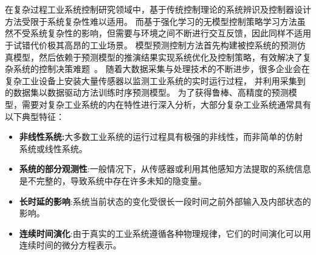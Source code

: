 \renewcommand{\b}{\boldsymbol}

\chapter{\TitlechapterI}
在复杂过程工业系统控制研究领域中，基于传统控制理论的系统辨识及控制器设计方法受限于系统复杂性难以适用。
而基于强化学习的无模型控制策略学习方法虽然不受系统复杂性的影响，但需要与环境之间不断进行交互反馈，因此同样不适用于试错代价极其高昂的工业场景。
模型预测控制方法首先构建被控系统的预测仿真模型，然后依赖于预测模型的推演结果实现系统优化及控制策略，有效解决了复杂系统的控制决策难题~\cite{Yuan2020,Member2019,wu2020optimization}。
随着大数据采集与处理技术的不断进步，很多企业会在复杂工业设备上安装大量传感器以监测工业系统的实时运行过程，
并利用采集到的数据集以数据驱动方法训练时序预测模型\cite{larsson2002identification}。
为了获得鲁棒、高精度的预测模型，需要对复杂工业系统的内在特性进行深入分析，大部分复杂工业系统通常具有以下典型特征：
\begin{itemize}
    \setlength{\itemsep}{0pt}
    \setlength{\parsep}{0pt}
    \setlength{\parskip}{0pt}
    \setlength{\topsep}{0pt}
    \setlength{\partopsep}{0pt}
\item \textbf{非线性系统:}大多数工业系统的运行过程具有极强的非线性，而非简单的仿射系统或线性系统。
\item \textbf{系统的部分观测性}:一般情况下，从传感器或利用其他感知方法提取的系统信息是不完整的，导致系统中存在许多未知的隐变量。
\item \textbf{长时延的影响}:系统当前状态的变化受很长一段时间之前外部输入及内部状态的影响。
\item \textbf{连续时间演化}:由于真实的工业系统遵循各种物理规律，它们的时间演化可以用连续时间的微分方程表示。
\end{itemize}

